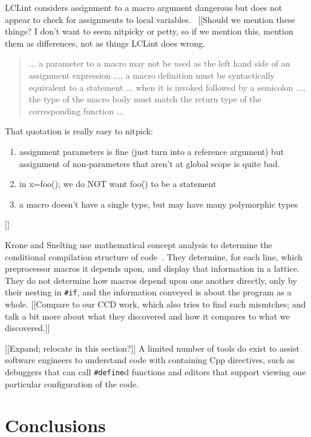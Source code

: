 \documentclass[10pt]{article}
\begin{document}
LCLint
considers assignment to a macro argument dangerous but does not appear
to check for assignments to local variables.~\cite[\S 8]{Evans:LCLint}
[[Should we mention these things?  I don't want to seem nitpicky or petty, so
if we mention this, mention them as differences, not as things LCLint does
wrong.
\begin{quote}
$\ldots$ a parameter to a macro may not be used as the left hand side
of an assignment expression $\ldots$, a macro definition must be
syntactically equivalent to a statement $\ldots$ when it is invoked followed by
a semicolon $\ldots$, the type of the macro body must match the return
type of the corresponding function $\ldots$~\cite[\S 8]{Evans:LCLint}
\end{quote}
That quotation is really easy to nitpick:
\begin{enumerate}
 \item assignment parameters is fine (just turn into a reference argument) but
    assignment of non-parameters that aren't at global scope is quite bad.
 \item in x=foo(); we do NOT want foo() to be a statement
 \item a macro doesn't have a single type, but may have many polymorphic types
\end{enumerate}
]]



Krone and Snelting use mathematical concept analysis to determine the
conditional compilation structure of code~\cite{Krone94}.  They determine,
for each line, which preprocessor macros it depends upon, and display that
information in a lattice.  They do not determine how macros depend upon one
another directly, only by their nesting in {\tt \#if}, and the information
conveyed is about the program as a whole.  [[Compare to our CCD work, which
also tries to find such mismtches; and talk a bit more about what they
discovered and how it compares to what we discovered.]]


[[Expand; relocate in this section?]]
A limited number of tools do exist to assist software engineers to
understand code with containing Cpp directives, such as debuggers that can
call {\tt \#define}d functions and editors that support viewing one
particular configuration of the code.




\section{Conclusions}
\label{sec:conclusion}
\end{document}
